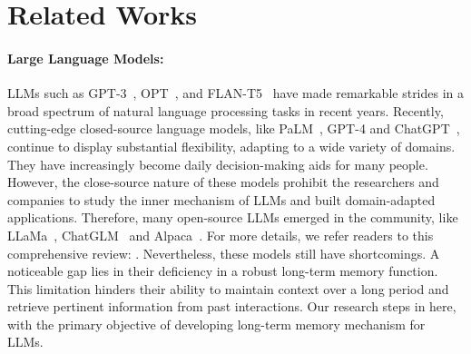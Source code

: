 \saveSpaceSec
\section{Related Works}
\saveSpaceSec
\paragraph{Large Language Models:}
LLMs such as GPT-3~\citep{brown2020language}, OPT~\citep{zhang2022opt}, and FLAN-T5~\citep{chung2022scaling} have made remarkable strides in a broad spectrum of natural language processing tasks in recent years. Recently, cutting-edge closed-source language models, like PaLM~\citep{chowdhery2022palm}, GPT-4 \citep{openai2023gpt4} and ChatGPT~\citep{chatgpt}, continue to display substantial flexibility, adapting to a wide variety of domains. They have increasingly become daily decision-making aids for many people. 
However, the close-source nature of these models prohibit the researchers and companies to study the inner mechanism of LLMs and built domain-adapted applications. Therefore, many open-source LLMs emerged in the community, like LLaMa~\citep{touvron2023llama}, ChatGLM~\citep{zeng2022glm} and Alpaca~\citep{alpaca}. For more details, we refer readers to this comprehensive review: \citet{zhao2023survey}.
Nevertheless, these models still have shortcomings. A noticeable gap lies in their deficiency in a robust long-term memory function. This limitation hinders their ability to maintain context over a long period and retrieve pertinent information from past interactions. Our research steps in here, with the primary objective of developing long-term memory mechanism for LLMs.

\saveSpaceSec
